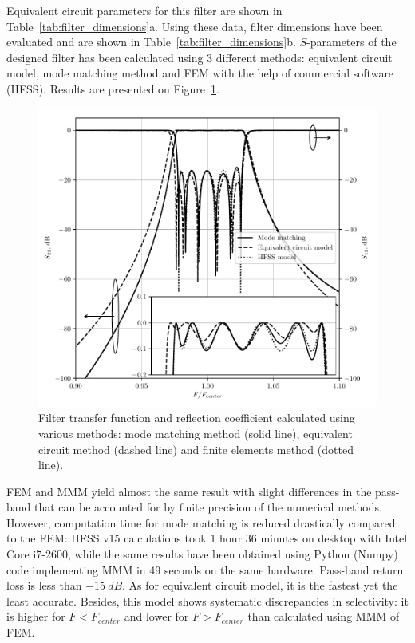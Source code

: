 \documentclass{pj}
\begin{document}
Equivalent circuit parameters for this filter are shown in
Table~\ref{tab:filter_dimensions}a. Using these data, filter
dimensions have been evaluated and are shown in
Table~\ref{tab:filter_dimensions}b. $S$-parameters of the designed
filter has been calculated using 3 different methods: equivalent
circuit model, mode matching method and FEM with the help of commercial
software (HFSS). Results are presented on
Figure~\ref{fig:transfer-function}.

\begin{figure}[h]
  \centering
  \includegraphics{images/reflections}
  \caption{Filter transfer function and reflection coefficient
    calculated using various methods: mode matching method (solid
    line), equivalent circuit method (dashed line) and finite elements
    method (dotted line).}
  \label{fig:transfer-function} 
\end{figure} 

FEM and MMM yield almost the same result with slight differences in
the pass-band that can be accounted for by finite precision of the
numerical methods. However, computation time for mode matching is
reduced drastically compared to the FEM: HFSS v15 calculations took 1
hour 36 minutes on desktop with Intel Core i7-2600, while the same
results have been obtained using Python (Numpy) code implementing MMM
in 49 seconds on the same hardware. Pass-band return loss is less than
$-15~dB$. As for equivalent circuit model, it is the fastest yet the
least accurate. Besides, this model shows systematic discrepancies in
selectivity: it is higher for $F < F_{center}$ and lower for
$F > F_{center}$ than calculated using MMM of FEM.
\end{document}
